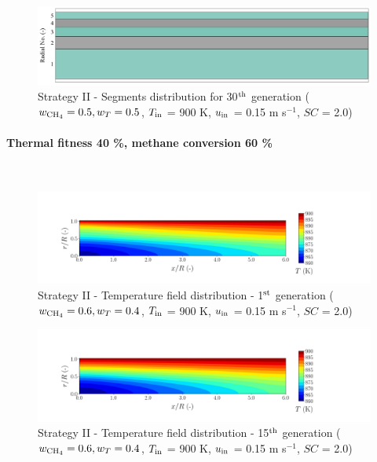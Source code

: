 \documentclass[preprint,12pt]{elsarticle}
\begin{document}
\begin{figure}[h!]
\centering
\includegraphics[width=120mm]{results/segments/5segEq/50C50T/seg.png}
\caption{\label{fig:30L6040G1-TField} Strategy II - Segments distribution for 30$^{\rm{th}}$ generation ($w_{\rm{CH_4}} = 0.5, w_T = 0.5$, $T_{\rm{in}}$ = 900 K, $u_{\rm{in}}$ = 0.15 m s$^{-1}$, $SC$ = 2.0)}
\end{figure}




\clearpage



\paragraph{Thermal fitness 40 \%, methane conversion 60 \%} \hspace{0pt} \\
\noindent 


\begin{figure}[h!]
\centering
\includegraphics[width=190mm]{results/5Eq/60C_40T/GEN1-TFIELD.png}
\caption{\label{fig:5RES6040G1-TField} Strategy II - Temperature field distribution - 1$^{\rm{st}}$ generation ($w_{\rm{CH_4}} = 0.6, w_T = 0.4$, $T_{\rm{in}}$ = 900 K, $u_{\rm{in}}$ = 0.15 m s$^{-1}$, $SC$ = 2.0)}
\end{figure}

\begin{figure}[h!]
\centering
\includegraphics[width=190mm]{results/5Eq/60C_40T/GEN15-TFIELD.png}
\caption{\label{fig:5RES6040G15-TField} Strategy II - Temperature field distribution - 15$^{\rm{th}}$ generation ($w_{\rm{CH_4}} = 0.6, w_T = 0.4$, $T_{\rm{in}}$ = 900 K, $u_{\rm{in}}$ = 0.15 m s$^{-1}$, $SC$ = 2.0)}
\end{figure}
\end{document}
